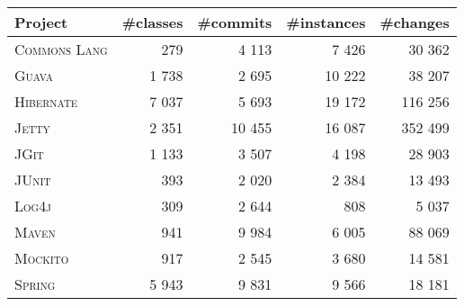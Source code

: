 \begin{tabularx}{\textwidth}{l R R R R}
\toprule
\textbf{Project} & \textbf{\#classes} & \textbf{\#commits} & \textbf{\#instances} & \textbf{\#changes} \\
\midrule
\textsc{Commons Lang} & 279 & 4 113 & 7 426 & 30 362 \\
\textsc{Guava} & 1 738 & 2 695 & 10 222 & 38 207 \\
\textsc{Hibernate} & 7 037 & 5 693 & 19 172 & 116 256 \\
\textsc{Jetty} & 2 351 & 10 455 & 16 087 & 352 499 \\
\textsc{JGit} & 1 133 & 3 507 & 4 198 & 28 903 \\
\textsc{JUnit} & 393 & 2 020 & 2 384 & 13 493 \\
\textsc{Log4j} & 309 & 2 644 & 808 & 5 037 \\
\textsc{Maven} & 941 & 9 984 & 6 005 & 88 069 \\
\textsc{Mockito} & 917 & 2 545 & 3 680 & 14 581 \\
\textsc{Spring} & 5 943 & 9 831 & 9 566 & 18 181 \\
\bottomrule
\end{tabularx}